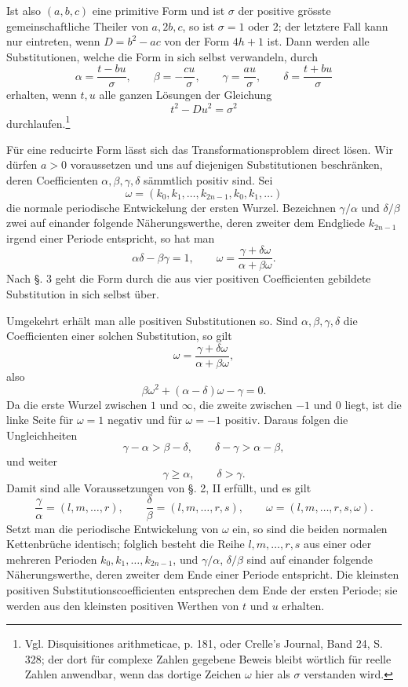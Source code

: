 \documentclass[11pt]{article}
\begin{document}
Ist also $(a,b,c)$ eine primitive Form und ist $\sigma$ der positive grösste gemeinschaftliche Theiler von $a,2b,c$, so ist $\sigma=1$ oder $2$; der letztere Fall kann nur eintreten, wenn $D=b^2-ac$ von der Form $4h+1$ ist. Dann werden alle Substitutionen, welche die Form in sich selbst verwandeln, durch
\[
 \alpha=\frac{t-bu}{\sigma},
 \qquad
 \beta=-\frac{cu}{\sigma},
 \qquad
 \gamma=\frac{au}{\sigma},
 \qquad
 \delta=\frac{t+bu}{\sigma}
\]
erhalten, wenn $t,u$ alle ganzen Lösungen der Gleichung
\[
 t^2-Du^2=\sigma^2
\]
durchlaufen.\footnote{Vgl. Disquisitiones arithmeticae, p. 181, oder Crelle's Journal, Band 24, S. 328; der dort für complexe Zahlen gegebene Beweis bleibt wörtlich für reelle Zahlen anwendbar, wenn das dortige Zeichen $\omega$ hier als $\sigma$ verstanden wird.}

Für eine reducirte Form lässt sich das Transformationsproblem direct lösen. Wir dürfen $a>0$ voraussetzen und uns auf diejenigen Substitutionen beschränken, deren Coefficienten $\alpha,\beta,\gamma,\delta$ sämmtlich positiv sind. Sei
\[
 \omega=(k_0,k_1,\ldots,k_{2n-1},k_0,k_1,\ldots)
\]
die normale periodische Entwickelung der ersten Wurzel. Bezeichnen $\gamma/\alpha$ und $\delta/\beta$ zwei auf einander folgende Näherungswerthe, deren zweiter dem Endgliede $k_{2n-1}$ irgend einer Periode entspricht, so hat man
\[
 \alpha\delta-\beta\gamma=1,
 \qquad
 \omega=\frac{\gamma+\delta\omega}{\alpha+\beta\omega}.
\]
Nach \S. 3 geht die Form durch die aus vier positiven Coefficienten gebildete Substitution in sich selbst über.

Umgekehrt erhält man alle positiven Substitutionen so. Sind $\alpha,\beta,\gamma,\delta$ die Coefficienten einer solchen Substitution, so gilt
\[
 \omega=\frac{\gamma+\delta\omega}{\alpha+\beta\omega},
\]
also
\[
 \beta\omega^2+(\alpha-\delta)\omega-
\gamma=0.
\]
Da die erste Wurzel zwischen $1$ und $\infty$, die zweite zwischen $-1$ und $0$ liegt, ist die linke Seite für $\omega=1$ negativ und für $\omega=-1$ positiv. Daraus folgen die Ungleichheiten
\[
 \gamma-\alpha>\beta-
\delta,
 \qquad
 \delta-\gamma>\alpha-
\beta,
\]
und weiter
\[
 \gamma\geq\alpha,
 \qquad
 \delta>\gamma.
\]
Damit sind alle Voraussetzungen von \S. 2, II erfüllt, und es gilt
\[
 \frac{\gamma}{\alpha}=(l,m,\ldots,r),
 \qquad
 \frac{\delta}{\beta}=(l,m,\ldots,r,s),
 \qquad
 \omega=(l,m,\ldots,r,s,\omega).
\]
Setzt man die periodische Entwickelung von $\omega$ ein, so sind die beiden normalen Kettenbrüche identisch; folglich besteht die Reihe $l,m,\ldots,r,s$ aus einer oder mehreren Perioden $k_0,k_1,\ldots,k_{2n-1}$, und $\gamma/\alpha$, $\delta/\beta$ sind auf einander folgende Näherungswerthe, deren zweiter dem Ende einer Periode entspricht. Die kleinsten positiven Substitutionscoefficienten entsprechen dem Ende der ersten Periode; sie werden aus den kleinsten positiven Werthen von $t$ und $u$ erhalten.
\end{document}

